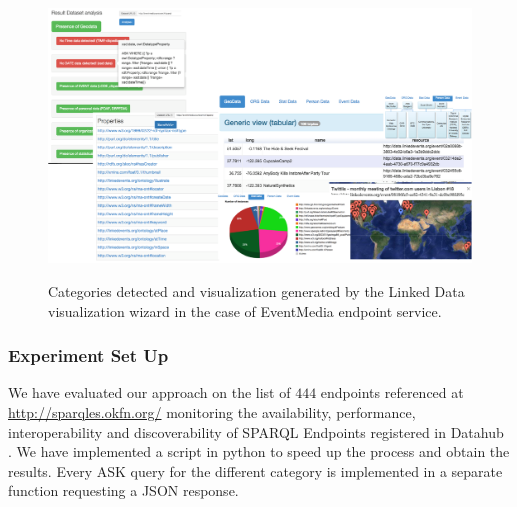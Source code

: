 \begin{figure}[ht!b]
\includegraphics[scale=.6]{img/result-wizviz.pdf}
\label{fig:visuSample}
\caption{Categories detected and visualization generated by the Linked Data visualization wizard in the case of EventMedia endpoint service. }
\end{figure}


\subsubsection{Experiment Set Up}
We have evaluated our approach on the list of $444$ endpoints referenced at \url{http://sparqles.okfn.org/} monitoring the availability, performance, interoperability and discoverability of SPARQL Endpoints registered in Datahub \cite{buil2013} . We have implemented a script in python to speed up the process and obtain the results. Every ASK query for the different category is implemented in a separate function requesting a JSON response.


